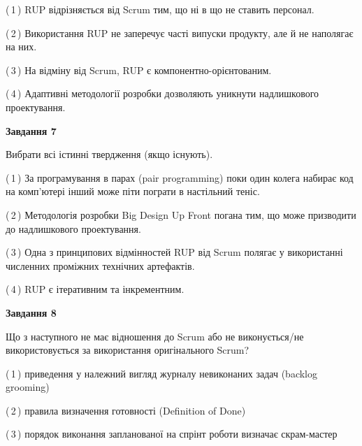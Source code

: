 \documentclass[10pt, ukrainian]{article}
\begin{document}
{\begin {large}
(\,1\,) RUP відрізняється від Scrum тим, що ні в що не ставить персонал.%



(\,2\,) Використання RUP не заперечує часті випуски продукту, але й не наполягає на них. %



(\,3\,) На відміну від Scrum, RUP є компонентно-орієнтованим. %



(\,4\,) Адаптивні методології розробки дозволяють уникнути надлишкового проектування. %


{\begin {center}\textbf{Завдання 7}\end {center}}\par
Вибрати всі істинні твердження (якщо існують).\par
\vspace{2mm}



(\,1\,) За програмування в парах (pair programming) поки один колега набирає код на комп'ютері інший може піти пограти в настільний теніс. %



(\,2\,) Методологія розробки Big Design Up Front погана тим, що може призводити до надлишкового проектування. %



(\,3\,) Одна з принципових відмінностей RUP від Scrum полягає у використанні численних проміжних технічних артефактів. %



(\,4\,) RUP є ітеративним та інкрементним.%


{\begin {center}\textbf{Завдання 8}\end {center}}\par
Що з наступного не має відношення до Scrum або не виконується/не використовується за використання оригінального Scrum?\par
\vspace{2mm}



(\,1\,) приведення у належний вигляд журналу невиконаних задач (backlog grooming) %



(\,2\,) правила визначення готовності (Definition of Done) %



(\,3\,) порядок виконання запланованої на спрінт роботи визначає скрам-мастер%




\end{large}}
\end{document}
